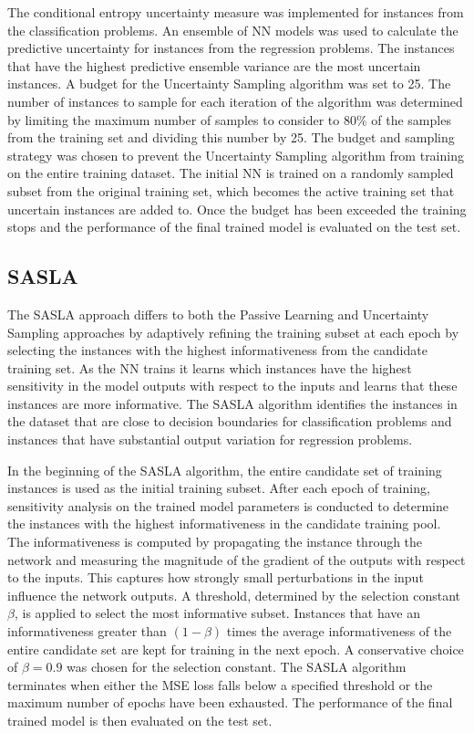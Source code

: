 \documentclass[conference]{IEEEtran}
\begin{document}
	The conditional entropy uncertainty measure was implemented for instances from the classification problems. An ensemble of NN models was used to calculate the predictive uncertainty for instances from the regression problems. The instances that have the highest predictive ensemble variance are the most uncertain instances. A budget for the Uncertainty Sampling algorithm was set to 25. The number of instances to sample for each iteration of the algorithm was determined by limiting the maximum number of samples to consider to 80\% of the samples from the training set and dividing this number by 25. The budget and sampling strategy was chosen to prevent the Uncertainty Sampling algorithm from training on the entire training dataset. The initial NN is trained on a randomly sampled subset from the original training set, which becomes the active training set that uncertain instances are added to. Once the budget has been exceeded the training stops and the performance of the final trained model is evaluated on the test set.
	
	\subsection{SASLA}
	The SASLA approach differs to both the Passive Learning and Uncertainty Sampling approaches by adaptively refining the training subset at each epoch by selecting the instances with the highest informativeness from the candidate training set. As the NN trains it learns which instances have the highest sensitivity in the model outputs with respect to the inputs and learns that these instances are more informative. The SASLA algorithm identifies the instances in the dataset that are close to decision boundaries for classification problems and instances that have substantial output variation for regression problems.
	
	In the beginning of the SASLA algorithm, the entire candidate set of training instances is used as the initial training subset. After each epoch of training, sensitivity analysis on the trained model parameters is conducted to determine the instances with the highest informativeness in the candidate training pool. The informativeness is computed by propagating the instance through the network and measuring the magnitude of the gradient of the outputs with respect to the inputs. This captures how strongly small perturbations in the input influence the network outputs. A threshold, determined by the selection constant $\beta$, is applied to select the most informative subset. Instances that have an informativeness greater than $(1-\beta)$ times the average informativeness of the entire candidate set are kept for training in the next epoch. A conservative choice of $\beta=0.9$ was chosen for the selection constant. The SASLA algorithm terminates when either the MSE loss falls below a specified threshold or the maximum number of epochs have been exhausted. The performance of the final trained model is then evaluated on the test set.
	
\end{document}
